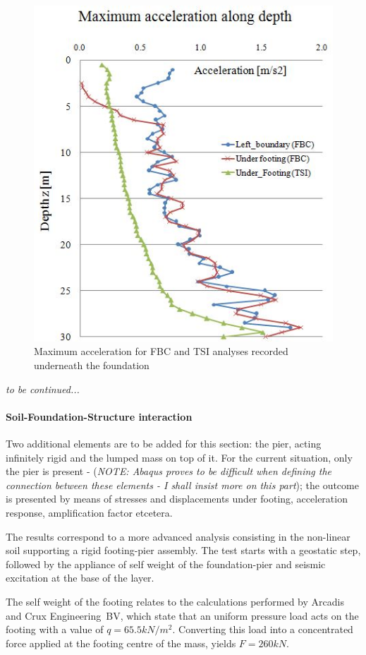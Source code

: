 	\begin{figure}[!h]
		\centering
		\includegraphics[width=0.6 \linewidth]{"max_ax"}
		\caption{Maximum acceleration for FBC and TSI analyses recorded underneath the foundation}
		\label{maxax}
	\end{figure}
	
\textit{to be continued...}	

\newpage
\paragraph{Soil-Foundation-Structure interaction}
Two additional elements are to be added for this section: the pier, acting infinitely rigid and the lumped mass on top of it. For the current situation, only the pier is present - (\textit{NOTE: Abaqus proves to be difficult when defining the connection between these elements - I shall insist more on this part}); the outcome is presented by means of stresses and displacements under footing, acceleration response, amplification factor etcetera.

The results correspond to a more advanced analysis consisting in the non-linear soil supporting a rigid footing-pier assembly. The test starts with a geostatic step, followed by the appliance of self weight of the foundation-pier and seismic excitation at the base of the layer. 

The self weight of the footing relates to the calculations performed by Arcadis and Crux \mbox{Engineering BV}, which state that an uniform pressure load acts on the footing with a value of $q=65.5 kN/m^2$. Converting this load into a concentrated force applied at the footing centre of the mass, yields $F=260 kN$. 

